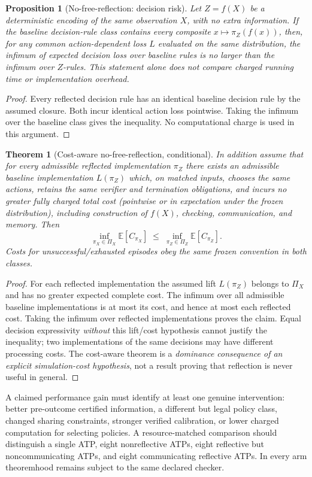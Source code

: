 \documentclass[10pt,letterpaper]{article}
\newtheorem{theorem}[definition]{Theorem}
\newtheorem{proposition}[definition]{Proposition}
\theoremstyle{remark}\newtheorem{remark}[definition]{Remark}
\begin{document}
\begin{proposition}[No-free-reflection: decision risk]
Let $Z=f(X)$ be a deterministic encoding of the same observation $X$, with no extra information. If the baseline decision-rule class contains every composite $x\mapsto\pi_Z(f(x))$, then, for any common \emph{action-dependent loss} $L$ evaluated on the same distribution, the infimum of expected decision loss over baseline rules is no larger than the infimum over $Z$-rules. This statement alone does \emph{not} compare charged running time or implementation overhead.
\end{proposition}
\begin{proof}
Every reflected decision rule has an identical baseline decision rule by the assumed closure. Both incur identical action loss pointwise. Taking the infimum over the baseline class gives the inequality. No computational charge is used in this argument.
\end{proof}
\begin{theorem}[Cost-aware no-free-reflection, conditional]
In addition assume that for \emph{every} admissible reflected implementation $\pi_Z$ there exists an admissible baseline implementation $L(\pi_Z)$ which, on matched inputs, chooses the same actions, retains the same verifier and termination obligations, and incurs \emph{no greater fully charged total cost} (pointwise or in expectation under the frozen distribution), including construction of $f(X)$, checking, communication, and memory. Then
\[
\inf_{\pi_X\in\Pi_X}\mathbb E[C_{\pi_X}]
\;\le\;
\inf_{\pi_Z\in\Pi_Z}\mathbb E[C_{\pi_Z}].
\]
Costs for unsuccessful/exhausted episodes obey the same frozen convention in both classes.
\end{theorem}
\begin{proof}
For each reflected implementation the assumed lift $L(\pi_Z)$ belongs to $\Pi_X$ and has no greater expected complete cost. The infimum over all admissible baseline implementations is at most its cost, and hence at most each reflected cost. Taking the infimum over reflected implementations proves the claim. Equal decision expressivity \emph{without} this lift/cost hypothesis cannot justify the inequality; two implementations of the same decisions may have different processing costs. The cost-aware theorem is a \emph{dominance consequence of an explicit simulation-cost hypothesis}, not a result proving that reflection is never useful in general.
\end{proof}

A claimed performance gain must identify at least one genuine intervention: better pre-outcome certified information, a different but legal policy class, changed sharing constraints, stronger verified calibration, or lower charged computation for selecting policies. A resource-matched comparison should distinguish a single ATP, eight nonreflective ATPs, eight reflective but noncommunicating ATPs, and eight communicating reflective ATPs. In every arm theoremhood remains subject to the same declared checker.
\end{document}
